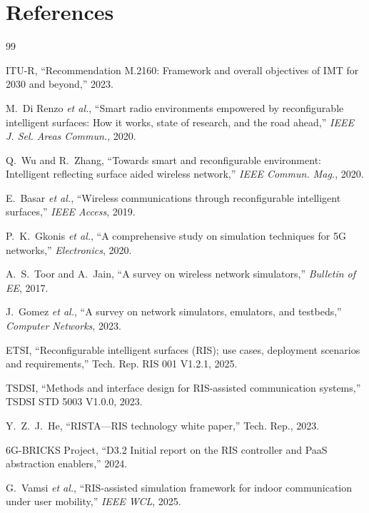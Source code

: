 \documentclass{article}
\begin{document}
\section*{References}
{\small

\begin{thebibliography}{99}

ITU-R, ``Recommendation M.2160: Framework and overall objectives of IMT for 2030 and beyond,'' 2023.

M.~Di Renzo \emph{et al.}, ``Smart radio environments empowered by reconfigurable intelligent surfaces: How it works, state of research, and the road ahead,'' \emph{IEEE J. Sel. Areas Commun.}, 2020.

Q.~Wu and R.~Zhang, ``Towards smart and reconfigurable environment: Intelligent reflecting surface aided wireless network,'' \emph{IEEE Commun. Mag.}, 2020.

E.~Basar \emph{et al.}, ``Wireless communications through reconfigurable intelligent surfaces,'' \emph{IEEE Access}, 2019.

P.~K.~Gkonis \emph{et al.}, ``A comprehensive study on simulation techniques for 5G networks,'' \emph{Electronics}, 2020.

A.~S.~Toor and A.~Jain, ``A survey on wireless network simulators,'' \emph{Bulletin of EE}, 2017.

J.~Gomez \emph{et al.}, ``A survey on network simulators, emulators, and testbeds,'' \emph{Computer Networks}, 2023.

ETSI, ``Reconfigurable intelligent surfaces (RIS); use cases, deployment scenarios and requirements,'' Tech. Rep. RIS 001 V1.2.1, 2025.

TSDSI, ``Methods and interface design for RIS-assisted communication systems,'' TSDSI STD 5003 V1.0.0, 2023.

Y.~Z.~J.~He, ``RISTA---RIS technology white paper,'' Tech. Rep., 2023.

6G-BRICKS Project, ``D3.2 Initial report on the RIS controller and PaaS abstraction enablers,'' 2024.

G.~Vamsi \emph{et al.}, ``RIS-assisted simulation framework for indoor communication under user mobility,'' \emph{IEEE WCL}, 2025.


\end{thebibliography}}
\end{document}
